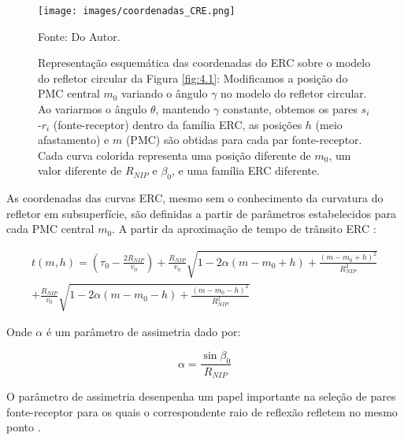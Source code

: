 \begin{figure}[htb]
\caption{Representação esquemática das coordenadas do ERC sobre o modelo do refletor circular da Figura \ref{fig:4.1}:
Modificamos a posição do PMC central $m_0$ variando o ângulo $\gamma$ no modelo do refletor circular.
Ao variarmos o ângulo $\theta$, mantendo $\gamma$ constante, obtemos os pares $s_i$-$r_i$ (fonte-receptor)
dentro da família
ERC, as posições $h$ (meio afastamento) e $m$ (PMC) são obtidas para cada par fonte-receptor.
Cada curva colorida representa uma posição
diferente de $m_0$, um valor diferente de $R_{NIP}$ e $\beta_0$, e uma família ERC diferente.}
\begin{center}
\texttt{[image: images/coordenadas\_CRE.png]}
\vspace{-0.3cm}
\end{center}
\begin{center}
 Fonte: Do Autor.
\end{center}
\label{fig:4.2}
\end{figure}

As coordenadas das curvas ERC, mesmo sem o conhecimento da curvatura do refletor em subsuperfície, são definidas
a partir de parâmetros estabelecidos para cada PMC central $m_0$. A partir da aproximação de tempo 
de trânsito ERC \cite{cre}:

\begin{multline}
\label{eq:4.66}
t(m,h)=(\tau_0-\frac{2R_{NIP}}{v_0})+\frac{R_{NIP}}{v_0}\sqrt{1-2\alpha(m-m_0+h)+\frac{(m-m_0+h)^2}{R_{NIP}^2}} \\
+\frac{R_{NIP}}{v_0}\sqrt{1-2\alpha(m-m_0-h)+\frac{(m-m_0-h)^2}{R_{NIP}^2}}
\end{multline}

Onde $\alpha$ é um parâmetro de assimetria dado por:

\begin{equation}
\label{eq:4.67}
 \alpha=\frac{\sin{\beta_0}}{R_{NIP}}
\end{equation}


O parâmetro de assimetria desenpenha um papel importante na seleção de pares fonte-receptor para os quais
o correspondente raio de reflexão refletem no mesmo ponto \cite{tygel}.
